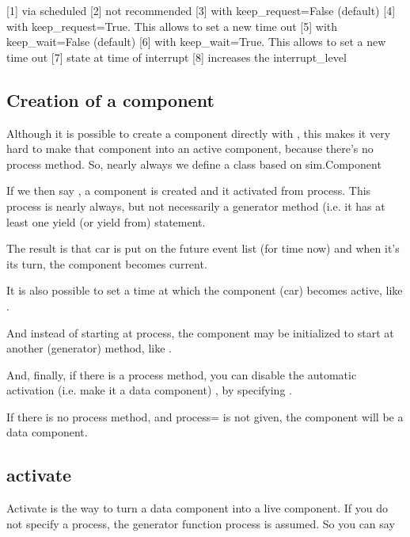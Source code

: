 \documentclass[letterpaper,10pt,english]{sphinxmanual}
\begin{document}
{[}1{]} via scheduled 
{[}2{]} not recommended 
{[}3{]} with keep\_request=False (default) 
{[}4{]} with keep\_request=True. This allows to set a new time out 
{[}5{]} with keep\_wait=False (default) 
{[}6{]} with keep\_wait=True. This allows to set a new time out 
{[}7{]} state at time of interrupt 
{[}8{]} increases the interrupt\_level 


\subsection{Creation of a component}
\label{\detokenize{Component:creation-of-a-component}}
Although it is possible to create a component directly with , this
makes it very hard to make that component into an active component,
because there’s no process method. So, nearly always we define a class based on
sim.Component

\begin{sphinxVerbatim}[commandchars=\\\{\}]
 
     
\end{sphinxVerbatim}

If we then say , a component is created and it activated from process. This
process is nearly always, but not necessarily a generator method (i.e. it has at least one yield (or yield from) statement.

The result is that car is put on the future event list (for time now) and when it’s its
turn, the component becomes current.

It is also possible to set a time at which the component (car) becomes active, like .

And instead of starting at process, the component may be initialized to start at another (generator) method,
like .

And, finally, if there is a process method, you can disable the automatic activation (i.e.
make it a data component) , by specifying .

If there is no process method, and process= is not given, the component will be a data component.


\subsection{activate}
\label{\detokenize{Component:activate}}
Activate is the way to turn a data component into a live component. If you do not specify a process,
the generator function process is assumed. So you can say
\end{document}
